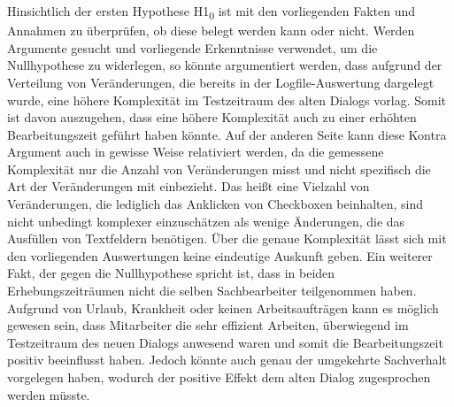 Hinsichtlich der ersten Hypothese H1\textsubscript{0} ist mit den vorliegenden Fakten und Annahmen zu überprüfen, ob diese belegt werden kann oder nicht. Werden Argumente gesucht und vorliegende Erkenntnisse verwendet, um die Nullhypothese zu widerlegen, so könnte argumentiert werden, dass aufgrund der Verteilung von Veränderungen, die bereits in der Logfile-Auswertung dargelegt wurde, eine höhere Komplexität im Testzeitraum des alten Dialogs vorlag. Somit ist davon auszugehen, dass eine höhere Komplexität auch zu einer erhöhten Bearbeitungszeit geführt haben könnte. Auf der anderen Seite kann diese Kontra Argument auch in gewisse Weise relativiert werden, da die gemessene Komplexität nur die Anzahl von Veränderungen misst und nicht spezifisch die Art der Veränderungen mit einbezieht. Das heißt eine Vielzahl von Veränderungen, die lediglich das Anklicken von Checkboxen beinhalten, sind nicht unbedingt komplexer einzuschätzen als wenige Änderungen, die das Ausfüllen von Textfeldern benötigen. Über die genaue Komplexität lässt sich mit den vorliegenden Auswertungen keine eindeutige Auskunft geben. Ein weiterer Fakt, der gegen die Nullhypothese spricht ist, dass in beiden Erhebungszeiträumen nicht die selben Sachbearbeiter teilgenommen haben. Aufgrund von Urlaub, Krankheit oder keinen Arbeitsaufträgen kann es möglich gewesen sein, dass Mitarbeiter die sehr effizient Arbeiten, überwiegend im Testzeitraum des neuen Dialogs anwesend waren und somit die Bearbeitungszeit positiv beeinflusst haben. Jedoch könnte auch genau der umgekehrte Sachverhalt vorgelegen haben, wodurch der positive Effekt dem alten Dialog zugesprochen werden müsste.

